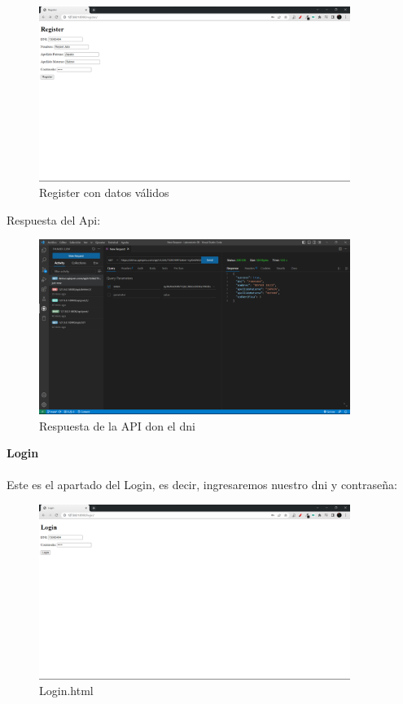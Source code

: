 \documentclass{article}
\begin{document}
        \begin{figure}[H]
            \centering
            \includegraphics[width=0.9\textwidth,keepaspectratio]{img/dni/registerValid.png}
            \caption{Register con datos válidos}
            \label{fig:enter-label}
        \end{figure}

        Respuesta del Api:
        
        \begin{figure}[H]
            \centering
            \includegraphics[width=0.9\textwidth,keepaspectratio]{img/dni/apiDNI.png}
            \caption{Respuesta de la API don el dni}
            \label{fig:enter-label}
        \end{figure}

     \textbf{Login}\\\\
        Este es el apartado del Login, es decir, ingresaremos nuestro dni y contraseña:
     
        \begin{figure}[H]
            \centering
            \includegraphics[width=0.9\textwidth,keepaspectratio]{img/dni/login.png}
            \caption{Login.html}
            \label{fig:enter-label}
        \end{figure}
\end{document}
